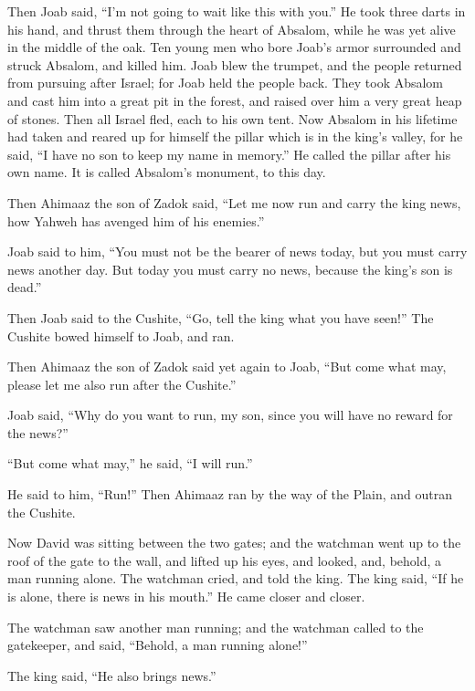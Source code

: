 {\par }{\PP {}Then Joab said, “I’m not going to wait like this with you.” He took three darts in his hand, and thrust them through the heart of Absalom, while he was yet alive in the middle of the oak.
Ten young men who bore Joab’s armor surrounded and struck Absalom, and killed him.
Joab blew the trumpet, and the people returned from pursuing after Israel; for Joab held the people back.
They took Absalom and cast him into a great pit in the forest, and raised over him a very great heap of stones. Then all Israel fled, each to his own tent.
Now Absalom in his lifetime had taken and reared up for himself the pillar which is in the king’s valley, for he said, “I have no son to keep my name in memory.” He called the pillar after his own name. It is called Absalom’s monument, to this day.
\par }{\PP {}Then Ahimaaz the son of Zadok said, “Let me now run and carry the king news, how Yahweh has avenged him of his enemies.”
\par }{\PP {}Joab said to him, “You must not be the bearer of news today, but you must carry news another day. But today you must carry no news, because the king’s son is dead.”
\par }{\PP {}Then Joab said to the Cushite, “Go, tell the king what you have seen!” The Cushite bowed himself to Joab, and ran.
\par }{\PP {}Then Ahimaaz the son of Zadok said yet again to Joab, “But come what may, please let me also run after the Cushite.”
\par }{\PP Joab said, “Why do you want to run, my son, since you will have no reward for the news?”
\par }{\PP {}“But come what may,” he said, “I will run.”
\par }{\PP He said to him, “Run!” Then Ahimaaz ran by the way of the Plain, and outran the Cushite.
\par }{\PP {}Now David was sitting between the two gates; and the watchman went up to the roof of the gate to the wall, and lifted up his eyes, and looked, and, behold, a man running alone.
The watchman cried, and told the king. The king said, “If he is alone, there is news in his mouth.” He came closer and closer.
\par }{\PP {}The watchman saw another man running; and the watchman called to the gatekeeper, and said, “Behold, a man running alone!”
\par }{\PP The king said, “He also brings news.”
}
